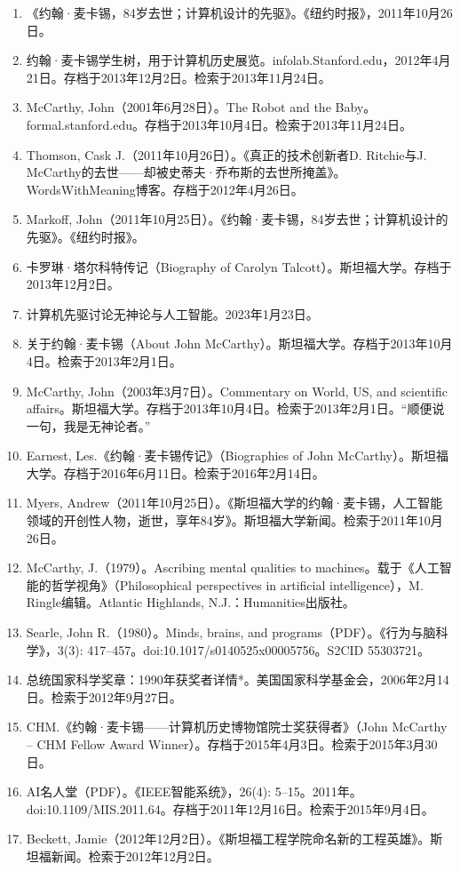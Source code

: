 \begin{enumerate}
\item 《约翰·麦卡锡，84岁去世；计算机设计的先驱》。《纽约时报》，2011年10月26日。
\item 约翰·麦卡锡学生树，用于计算机历史展览。infolab.Stanford.edu，2012年4月21日。存档于2013年12月2日。检索于2013年11月24日。
\item McCarthy, John（2001年6月28日）。The Robot and the Baby。formal.stanford.edu。存档于2013年10月4日。检索于2013年11月24日。
\item Thomson, Cask J.（2011年10月26日）。《真正的技术创新者D. Ritchie与J. McCarthy的去世——却被史蒂夫·乔布斯的去世所掩盖》。WordsWithMeaning博客。存档于2012年4月26日。
\item Markoff, John（2011年10月25日）。《约翰·麦卡锡，84岁去世；计算机设计的先驱》。《纽约时报》。
\item 卡罗琳·塔尔科特传记（Biography of Carolyn Talcott）。斯坦福大学。存档于2013年12月2日。
\item 计算机先驱讨论无神论与人工智能。2023年1月23日。
\item 关于约翰·麦卡锡（About John McCarthy）。斯坦福大学。存档于2013年10月4日。检索于2013年2月1日。
\item McCarthy, John（2003年3月7日）。Commentary on World, US, and scientific affairs。斯坦福大学。存档于2013年10月4日。检索于2013年2月1日。“顺便说一句，我是无神论者。”
\item Earnest, Les.《约翰·麦卡锡传记》（Biographies of John McCarthy）。斯坦福大学。存档于2016年6月11日。检索于2016年2月14日。
\item Myers, Andrew（2011年10月25日）。《斯坦福大学的约翰·麦卡锡，人工智能领域的开创性人物，逝世，享年84岁》。斯坦福大学新闻。检索于2011年10月26日。
\item McCarthy, J.（1979）。Ascribing mental qualities to machines。载于《人工智能的哲学视角》（Philosophical perspectives in artificial intelligence），M. Ringle编辑。Atlantic Highlands, N.J.：Humanities出版社。
\item Searle, John R.（1980）。Minds, brains, and programs（PDF）。《行为与脑科学》，3(3): 417–457。doi:10.1017/s0140525x00005756。S2CID 55303721。
\item 总统国家科学奖章：1990年获奖者详情*。美国国家科学基金会，2006年2月14日。检索于2012年9月27日。
\item CHM.《约翰·麦卡锡——计算机历史博物馆院士奖获得者》（John McCarthy – CHM Fellow Award Winner）。存档于2015年4月3日。检索于2015年3月30日。
\item AI名人堂（PDF）。《IEEE智能系统》，26(4): 5–15。2011年。doi:10.1109/MIS.2011.64。存档于2011年12月16日。检索于2015年9月4日。
\item Beckett, Jamie（2012年12月2日）。《斯坦福工程学院命名新的工程英雄》。斯坦福新闻。检索于2012年12月2日。
\end{enumerate}
